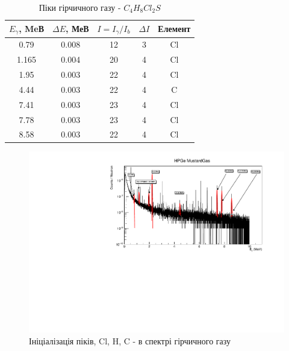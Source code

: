 \documentclass[a4paper, 14pt]{article}
\numberwithin{equation}{section}
\numberwithin{table}{section}
\begin{document}
\begin{table}[h]
	\centering
	\caption{Піки гірчичного газу - $C_4H_8Cl_2S$} 
	\begin{tabular}{|c|c|c|c|c|} 
		\hline
		$E_{\gamma}$, MeВ & $\Delta{E}$, МеВ & $I = I_{\gamma} / I_{b}$ & $\Delta{I}$ & Елемент\\
		\hline
		0.79 & 0.008 & 12 & 3 & Cl\\
		\hline
		1.165 & 0.004 & 20 & 4 & Cl \\	
		\hline
		1.95 & 0.003 & 22 & 4 & Cl \\	
		\hline		
		4.44 & 0.003 & 22 & 4 & C \\	
		\hline
		7.41 & 0.003 & 23 & 4 & Cl\\	
		\hline
		7.78 & 0.003 & 23 & 4 & Cl\\	
		\hline			
		8.58 & 0.003 & 22 & 4 & Cl\\	
		\hline
	\end{tabular}
	\label{tabl:ResultsMustard}
\end{table}

\begin{figure}[hbt!]
	\centering \includegraphics[width=1\textwidth]{res/mustard_gas.pdf}
	\caption{Ініціалізація піків, Cl, H, C - в спектрі гірчичного газу} 
	\label{ris:mustard}	
\end{figure} 
\end{document}
